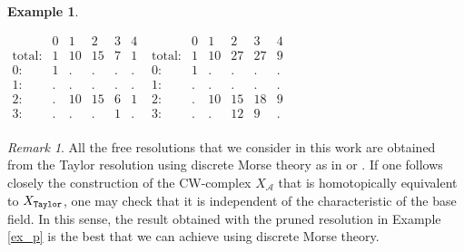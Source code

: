 \documentclass[12pt]{amsart}
\theoremstyle{definition}
\newtheorem{example}[theorem]{Example}
\theoremstyle{remark}
\newtheorem{remark}[theorem]{Remark}
\numberwithin{equation}{section}
\newcommand{\cA}{{\mathcal A}}
\newcommand{\phil}[1]{{\color{red} \sf $\star\star$ Philippe: [#1]}}
\begin{document}
\begin{example}
\begin{center}
{\small $\begin{matrix}
&0&1&2&3&4\\\text{total:}&1&10&15&7&1\\\text{0:}&1&\text{.}&\text{.}&\text{.}&\text{.}\\\text{1:}&\text{.}&\text{.}&\text{.}&\text{.}&\text{.}\\\text{2:}&\text{.}&10&15&6&1\\\text{3:}&\text{.}&\text{.}&\text{.}&1&\text{.}\\\end{matrix}
$ \hskip 3cm
$\begin{matrix}
&0&1&2&3&4\\\text{total:}&1&10&27&27&9\\\text{0:}&1&\text{.}&\text{.}&\text{.}&\text{.}\\\text{1:}&\text{.}&\text{.}&\text{.}&\text{.}&\text{.}\\\text{2:}&\text{.}&10&15&18&9\\\text{3:}&\text{.}&\text{.}&12&9&\text{.}\\\end{matrix}
$}
\end{center}
\end{example}


\begin{remark}
%
%
%
All the free resolutions that we consider in this work are obtained
from the Taylor resolution using discrete Morse theory as in
\cite{BW} or \cite{JW}. If one follows closely the construction of the CW-complex
$X_{\cA}$ that is homotopically equivalent to $X_{\tt Taylor}$, one
may check that it is independent of the characteristic of the base
field.
%
%
In this sense, the result obtained with the pruned resolution in Example \ref{ex_p} is the best that we can achieve
using discrete Morse theory.
\end{remark}
\end{document}
